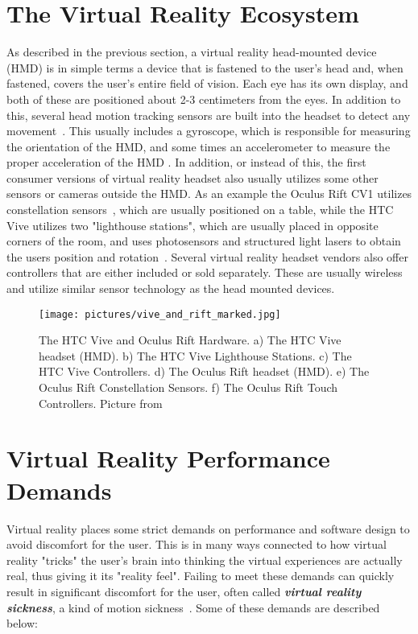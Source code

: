 \section{The Virtual Reality Ecosystem}
As described in the previous section, a virtual reality head-mounted device (HMD) is in simple terms a device that is fastened to the user's head and, when fastened, 
covers the user's entire field of vision. 
Each eye has its own display, and both of these are positioned about 2-3 centimeters from the eyes. In addition to this, several head motion
tracking sensors are built into the headset to detect any movement~\citep{POLYGON2016}. This usually includes a gyroscope, which is responsible for measuring the orientation of the
HMD, and some times an accelerometer to measure the proper acceleration of the HMD \citep{THEVERGE2016}. In addition, or instead of this, the first consumer versions of 
virtual reality headset also usually utilizes some other sensors or cameras outside the HMD. As an example the Oculus Rift CV1 utilizes constellation sensors~\citep{VRFOCUS2015}, 
which are usually positioned on a table, while the HTC Vive utilizes two "lighthouse stations", which are usually placed in opposite corners of the room, and uses photosensors and 
structured light lasers to obtain the users position and rotation~\citep{GIZMODO2015}. 
Several virtual reality headset vendors also offer controllers that are either included or sold separately. These are usually wireless and 
utilize similar sensor technology as the head mounted devices.   


\begin{figure}%
	\texttt{[image: pictures/vive\_and\_rift\_marked.jpg]}
	\caption[The HTC Vive and Oculus Rift Hardware]{The HTC Vive and Oculus Rift Hardware. 
    a) The HTC Vive headset (HMD). b) The HTC Vive Lighthouse Stations. c) The HTC Vive Controllers. d) The Oculus Rift headset (HMD). e) The Oculus Rift Constellation Sensors. 
    f) The Oculus Rift Touch Controllers. Picture from \citet{ROADTOVR2016}}
	\label{fig:vive_and_rift_marked}
\end{figure} 

\section{Virtual Reality Performance Demands}
Virtual reality places some strict demands on performance and software design to avoid discomfort for the user. This is in many ways connected to how virtual reality "tricks" 
the user's brain into thinking the virtual experiences are actually real, thus giving it its "reality feel". Failing to meet these demands can quickly result in significant 
discomfort for the user, often called \textbf{\textit{virtual reality sickness}}, a kind of motion sickness~\citep{ARSTECHNICA2013}. Some of these demands are described below:

